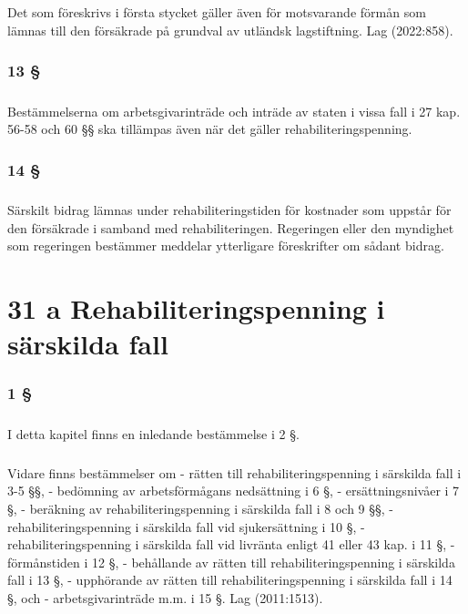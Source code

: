 \documentclass[a4paper,notitlepage,openany,10pt]{book}
\begin{document}
\paragraph*{}
Det som föreskrivs i första stycket gäller även för motsvarande förmån som lämnas till den försäkrade på grundval av utländsk lagstiftning.
Lag (2022:858).
\subsection*{13 §}
\paragraph*{}
Bestämmelserna om arbetsgivarinträde och inträde av staten i vissa fall i 27 kap. 56-58 och 60 §§ ska tillämpas även när det gäller rehabiliteringspenning.
\subsection*{14 §}
\paragraph*{}
Särskilt bidrag lämnas under rehabiliteringstiden för kostnader som uppstår för den försäkrade i samband med rehabiliteringen. Regeringen eller den myndighet som regeringen bestämmer meddelar ytterligare föreskrifter om sådant bidrag.
\chapter*{31 a Rehabiliteringspenning i särskilda fall}
\subsection*{1 §}
\paragraph*{}
I detta kapitel finns en inledande bestämmelse i 2 §.
\paragraph*{}
Vidare finns bestämmelser om
\newline - rätten till rehabiliteringspenning i särskilda fall i 3-5 §§,
\newline - bedömning av arbetsförmågans nedsättning i 6 §,
\newline - ersättningsnivåer i 7 §,
\newline - beräkning av rehabiliteringspenning i särskilda fall i 8 och 9 §§,
\newline - rehabiliteringspenning i särskilda fall vid sjukersättning i 10 §,
\newline - rehabiliteringspenning i särskilda fall vid livränta enligt 41 eller 43 kap. i 11 §,
\newline - förmånstiden i 12 §,
\newline - behållande av rätten till rehabiliteringspenning i särskilda fall i 13 §,
\newline - upphörande av rätten till rehabiliteringspenning i särskilda fall i 14 §, och
\newline - arbetsgivarinträde m.m. i 15 §.
Lag (2011:1513).
\end{document}
